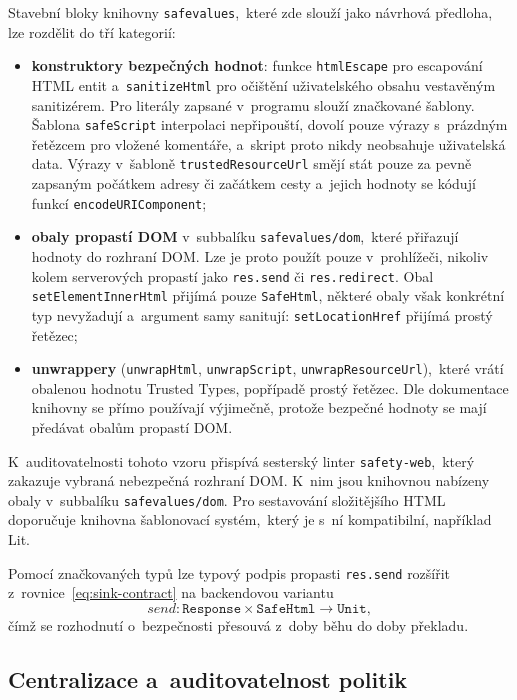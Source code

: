 Stavební bloky knihovny \texttt{safevalues},~které zde slouží jako návrhová předloha, lze rozdělit do tří kategorií:
\begin{itemize}
    \item \textbf{konstruktory bezpečných hodnot}: funkce \texttt{htmlEscape} pro escapování HTML entit a~\texttt{sanitizeHtml} pro očištění uživatelského obsahu vestavěným sanitizérem. Pro literály zapsané v~programu slouží značkované šablony. Šablona \texttt{safeScript} interpolaci nepřipouští, dovolí pouze výrazy s~prázdným řetězcem pro vložené komentáře, a~skript proto nikdy neobsahuje uživatelská data. Výrazy v~šabloně \texttt{trustedResourceUrl} smějí stát pouze za pevně zapsaným počátkem adresy či začátkem cesty a~jejich hodnoty se kódují funkcí \texttt{encodeURIComponent};
    \item \textbf{obaly propastí DOM} v~subbalíku \texttt{safevalues/dom},~které přiřazují hodnoty do rozhraní DOM. Lze je proto použít pouze v~prohlížeči, nikoliv kolem serverových propastí jako \texttt{res.send} či \texttt{res.redirect}. Obal \texttt{setElementInnerHtml} přijímá pouze \texttt{SafeHtml}, některé obaly však konkrétní typ nevyžadují a~argument samy sanitují: \texttt{setLocationHref} přijímá prostý řetězec;
    \item \textbf{unwrappery} (\texttt{unwrapHtml}, \texttt{unwrapScript}, \texttt{unwrapResourceUrl}),~které vrátí obalenou hodnotu Trusted Types, popřípadě prostý řetězec. Dle dokumentace knihovny se přímo používají výjimečně, protože bezpečné hodnoty se mají předávat obalům propastí DOM.
\end{itemize}

K~auditovatelnosti tohoto vzoru přispívá sesterský linter \texttt{safety-web},~který zakazuje vybraná nebezpečná rozhraní DOM. K~nim jsou knihovnou nabízeny obaly v~subbalíku \texttt{safevalues/dom}. Pro sestavování složitějšího HTML doporučuje knihovna šablonovací systém,~který je s~ní kompatibilní, například Lit.

Pomocí značkovaných typů lze typový podpis propasti \texttt{res.send} rozšířit z~rovnice~\ref{eq:sink-contract} na backendovou variantu
\begin{equation}
    \mathit{send} : \mathtt{Response} \times \mathtt{SafeHtml} \longrightarrow \mathtt{Unit},
    \label{eq:send-contract}
\end{equation}
čímž se rozhodnutí o~bezpečnosti přesouvá z~doby běhu do doby překladu.

\subsection{Centralizace a~auditovatelnost politik}
\label{sec:audit}

